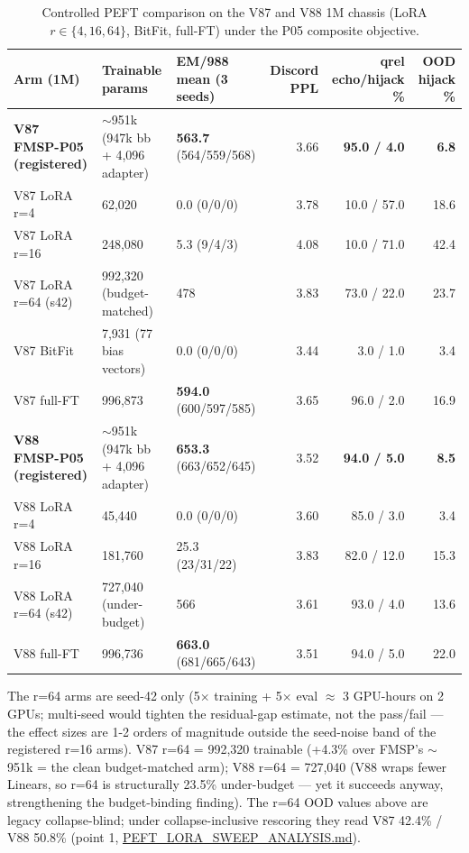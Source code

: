 \documentclass[11pt]{article}
\begin{document}
\begin{table}[!t]
\centering\footnotesize
\caption{Controlled PEFT comparison on the V87 and V88 1M chassis (LoRA $r \in \{4,16,64\}$, BitFit, full-FT) under the P05 composite objective.}
\label{tab:peft-comparison}
\begin{tabular}{p{3.0cm}p{2.4cm}p{2.0cm}rrr}
\toprule
Arm (1M) & Trainable params & EM/988 mean (3 seeds) & Discord PPL & qrel echo/hijack \% & OOD hijack \% \\
\midrule
\textbf{V87 FMSP-P05 (registered)} & $\sim$951k (947k bb + 4{,}096 adapter) & \textbf{563.7} (564/559/568) & 3.66 & \textbf{95.0 / 4.0} & \textbf{6.8} \\
V87 LoRA r=4 & 62{,}020 & 0.0 (0/0/0) & 3.78 & 10.0 / 57.0 & 18.6 \\
V87 LoRA r=16 & 248{,}080 & 5.3 (9/4/3) & 4.08 & 10.0 / 71.0 & 42.4 \\
V87 LoRA r=64 (s42) \dag{} & 992{,}320 (budget-matched) & 478 & 3.83 & 73.0 / 22.0 & 23.7 \\
V87 BitFit & 7{,}931 (77 bias vectors) & 0.0 (0/0/0) & 3.44 & 3.0 / 1.0 & 3.4 \\
V87 full-FT & 996{,}873 & \textbf{594.0} (600/597/585) & 3.65 & 96.0 / 2.0 & 16.9 \\
\textbf{V88 FMSP-P05 (registered)} & $\sim$951k (947k bb + 4{,}096 adapter) & \textbf{653.3} (663/652/645) & 3.52 & \textbf{94.0 / 5.0} & \textbf{8.5} \\
V88 LoRA r=4 & 45{,}440 & 0.0 (0/0/0) & 3.60 & 85.0 / 3.0 & 3.4 \\
V88 LoRA r=16 & 181{,}760 & 25.3 (23/31/22) & 3.83 & 82.0 / 12.0 & 15.3 \\
V88 LoRA r=64 (s42) \dag{} & 727{,}040 (under-budget) & 566 & 3.61 & 93.0 / 4.0 & 13.6 \\
V88 full-FT & 996{,}736 & \textbf{663.0} (681/665/643) & 3.51 & 94.0 / 5.0 & 22.0 \\
\bottomrule
\end{tabular}
\end{table}

\dag{} The r=64 arms are seed-42 only (5$\times$ training + 5$\times$ eval $\approx$ 3 GPU-hours on 2 GPUs; multi-seed would tighten the residual-gap estimate, not the pass/fail --- the effect sizes are 1-2 orders of magnitude outside the seed-noise band of the registered r=16 arms). V87 r=64 = 992{,}320 trainable (+4.3\% over FMSP's $\sim$951k = the clean budget-matched arm); V88 r=64 = 727{,}040 (V88 wraps fewer Linears, so r=64 is structurally 23.5\% under-budget --- yet it succeeds anyway, strengthening the budget-binding finding). The r=64 OOD values above are legacy collapse-blind; under collapse-inclusive rescoring they read V87 42.4\% / V88 50.8\% (point 1, \href{https://github.com/llaa33219/MicroMixer-4/blob/4bb630413dfa58ef3141291e121ab8c006d03235/PEFT_LORA_SWEEP_ANALYSIS.md}{PEFT\_LORA\_SWEEP\_ANALYSIS.md}).
\end{document}
